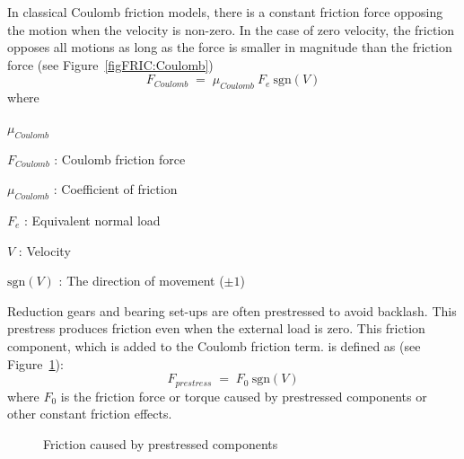 In classical Coulomb friction models, there is a constant friction force
opposing the motion when the velocity is non-zero. In the case of zero velocity,
the friction opposes all motions as long as the force is smaller in magnitude
than the friction force (see Figure~\ref{figFRIC:Coulomb})
%
\begin{equation}
F_{\textit{Coulomb}} \;=\; \mu_{\textit{Coulomb}}\: F_e\: \text{sgn}(V)
\end{equation}
%
where
%
\begin{namelist}{$\mu_{\textit{Coulomb}}$}
\item[$F_{\textit{Coulomb}}$]   : Coulomb friction force
\item[$\mu_{\textit{Coulomb}}$] : Coefficient of friction
\item[$F_e$]                    : Equivalent normal load
\item[$V$]                      : Velocity
\item[$\text{sgn}(V)$]          : The direction of movement ($\pm 1$)
\end{namelist}

Reduction gears and bearing set-ups are often prestressed to avoid backlash.
This prestress produces friction even when the external load is zero.
This friction component, which is added to the Coulomb friction term.
is defined as (see Figure~\ref{figFric:Prestress}):
%
\begin{equation}
F_{\textit{prestress}} \;=\; F_0\: \text{sgn}(V)
\end{equation}
%
where $F_0$ is the friction force or torque caused by prestressed components
or other constant friction effects.

\begin{figure}[b]
\caption{Friction caused by prestressed components}
\label{figFric:Prestress}
\end{figure}


